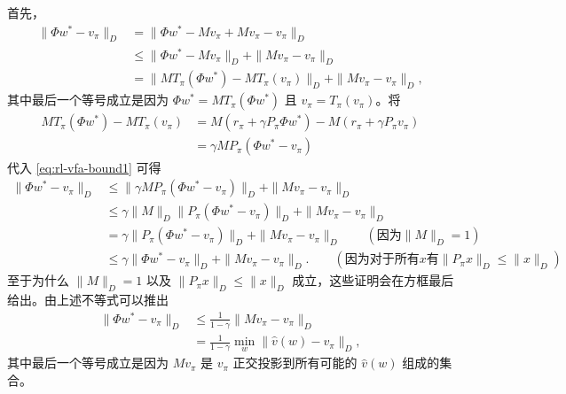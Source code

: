 \begin{note}
首先，
\begin{equation}
\begin{aligned}
\| \Phi w^{*} - v_{\pi} \|_{D} &= \| \Phi w^{*} - M v_{\pi} + M v_{\pi} - v_{\pi} \|_{D} \\
&\leqslant \| \Phi w^{*} - M v_{\pi} \|_{D} + \| M v_{\pi} - v_{\pi} \|_{D} \\
&= \| M T_{\pi}(\Phi w^{*}) - M T_{\pi}(v_{\pi}) \|_{D} + \| M v_{\pi} - v_{\pi} \|_{D},
\end{aligned}
\label{eq:rl-vfa-bound1}
\end{equation}
其中最后一个等号成立是因为 $\Phi w^{*} = MT_{\pi}(\Phi w^{*})$ 且 $v_{\pi} = T_{\pi}(v_{\pi})$。将
\begin{equation*}
\begin{aligned}
M T_{\pi}(\Phi w^{*}) - M T_{\pi}(v_{\pi}) &= M (r_{\pi} + \gamma P_{\pi} \Phi w^{*}) - M (r_{\pi} + \gamma P_{\pi} v_{\pi}) \\
&= \gamma M P_{\pi} (\Phi w^{*} - v_{\pi})
\end{aligned}
\end{equation*}
代入 \cref{eq:rl-vfa-bound1} 可得
\begin{equation*}
\begin{aligned}
\| \Phi w^{*} - v_{\pi} \|_{D} &\leqslant \| \gamma M P_{\pi} (\Phi w^{*} - v_{\pi}) \|_{D} + \| M v_{\pi} - v_{\pi} \|_{D} \\
&\leqslant \gamma \| M \|_{D} \| P_{\pi} (\Phi w^{*} - v_{\pi}) \|_{D} + \| M v_{\pi} - v_{\pi} \|_{D} \\
&= \gamma \| P_{\pi} (\Phi w^{*} - v_{\pi}) \|_{D} + \| M v_{\pi} - v_{\pi} \|_{D} \qquad (\text{因为} \| M \|_{D} = 1) \\
&\leqslant \gamma \| \Phi w^{*} - v_{\pi} \|_{D} + \| M v_{\pi} - v_{\pi} \|_{D}. \qquad (\text{因为对于所有} x \text{有} \| P_{\pi} x \|_{D} \leqslant \| x \|_{D})
\end{aligned}
\end{equation*}
至于为什么 $\| M\|_D = 1$ 以及 $\| P_{\pi}x\|_D\leqslant \| x\|_D$ 成立，这些证明会在方框最后给出。由上述不等式可以推出
\begin{equation*}
\begin{aligned}
\| \Phi w^{*} - v_{\pi} \|_{D} &\leqslant \frac{1}{1 - \gamma} \| M v_{\pi} - v_{\pi} \|_{D} \\
&= \frac{1}{1 - \gamma} \min_{w} \| \hat{v}(w) - v_{\pi} \|_{D},
\end{aligned}
\end{equation*}
其中最后一个等号成立是因为 $Mv_{\pi}$ 是 $v_{\pi}$ 正交投影到所有可能的 $\hat{v}(w)$ 组成的集合。


\end{note}
